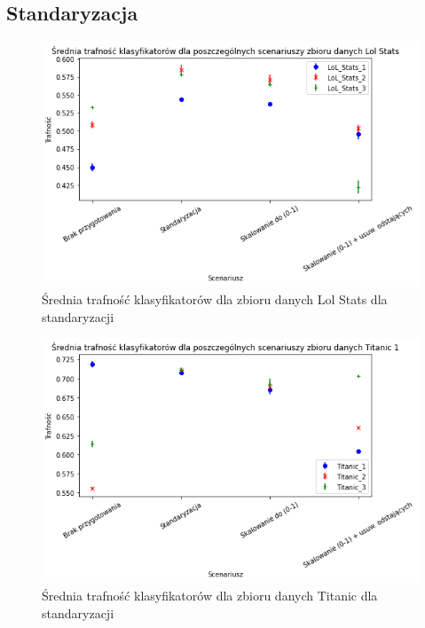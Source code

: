 \documentclass{book}
\begin{document}
\subsection{Standaryzacja}

\begin{figure}[H]
    \centerline{\includegraphics[scale=0.8]{Lol_Stats_Avg_Standaryzacja}}
    \centering
    \caption{Średnia trafność klasyfikatorów dla zbioru danych Lol Stats 
    dla standaryzacji}
    \end{figure}

\begin{figure}[H]
    \centerline{\includegraphics[scale=0.8]{Titanic_Avg_Standaryzacja}}
    \centering
    \caption{Średnia trafność klasyfikatorów dla zbioru danych Titanic 
    dla standaryzacji}
    \end{figure}
\end{document}

